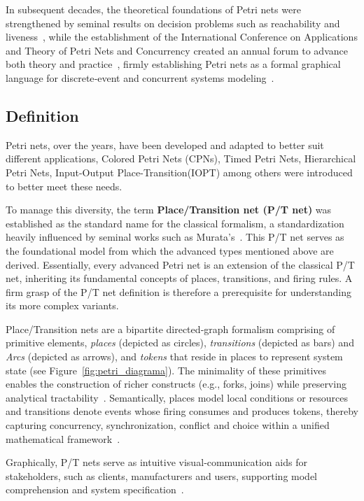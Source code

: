 In subsequent decades, the theoretical foundations of Petri nets were strengthened by seminal results on decision problems such as reachability and liveness~\cite{murata}, while the establishment of the International Conference on Applications and Theory of Petri Nets and Concurrency created an annual forum to advance both theory and practice~\cite{ICPN1980}, firmly establishing Petri nets as a formal graphical language for discrete‐event and concurrent systems modeling~\cite{WikiPetriNet2025}.

\subsection{Definition}
\label{subsec:definition}


Petri nets, over the years, have been developed and adapted to better suit different applications,  Colored Petri Nets (CPNs), Timed Petri Nets, Hierarchical Petri Nets, Input-Output Place-Transition(IOPT) among others were introduced to better meet these needs. 


To manage this diversity, the term \textbf{Place/Transition net (P/T net)} was established as the standard name for the classical formalism, a standardization heavily influenced by seminal works such as Murata's~\cite{murata}. This P/T net serves as the foundational model from which the advanced types mentioned above are derived. Essentially, every advanced Petri net is an extension of the classical P/T net, inheriting its fundamental concepts of places, transitions, and firing rules. A firm grasp of the P/T net definition is therefore a prerequisite for understanding its more complex variants.

Place/Transition nets are a bipartite directed‐graph formalism comprising of primitive elements, \emph{places} (depicted as circles), \emph{transitions} (depicted as bars) and \emph{Arcs} (depicted as arrows), and \emph{tokens} that reside in places to represent system state (see Figure~\ref{fig:petri_diagrama}). The minimality of these primitives enables the construction of richer constructs (e.g., forks, joins) while preserving analytical tractability~\cite{50-years}. Semantically, places model local conditions or resources and transitions denote events whose firing consumes and produces tokens, thereby capturing concurrency, synchronization, conflict and choice within a unified mathematical framework~\cite{50-years}. 

Graphically, P/T nets serve as intuitive visual‐communication aids for stakeholders, such as clients, manufacturers and users, supporting model comprehension and system specification~\cite{pn-Wolfgang}.

